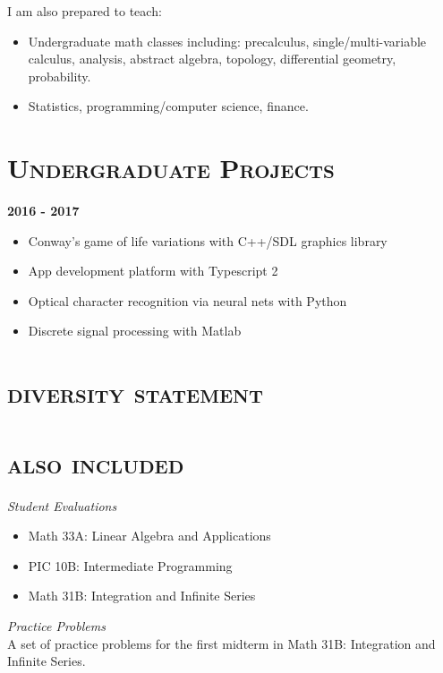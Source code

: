 \documentclass[margin, 10pt]{res} %
\begin{document}
\begin{resume}
  I am also prepared to teach:
  \begin{itemize}
  \item Undergraduate math classes including: precalculus, single/multi-variable calculus, analysis, abstract algebra, topology, differential geometry, probability.
  \item Statistics, programming/computer science, finance.
  \end{itemize}

\section{\textsc{Undergraduate Projects}}
  \phantom{Mentor} \hfill \textbf{2016 - 2017}  
  \begin{itemize}
  \item Conway's game of life variations with C++/SDL graphics library %
  \item App development platform with Typescript 2 %
  \item Optical character recognition via neural nets with Python %
  \item Discrete signal processing with Matlab %
  \end{itemize}

\section{\textsc{diversity statement}}


\section{\textsc{also included}}
\textit{Student Evaluations}
  \begin{itemize}
  \item Math 33A: Linear Algebra and Applications %
  \item PIC 10B: Intermediate Programming %
  \item Math 31B: Integration and Infinite Series %
  \end{itemize}
\end{resume}

\textit{Practice Problems} \\
A set of practice problems for the first midterm in Math 31B: Integration and Infinite Series.
\end{document}
